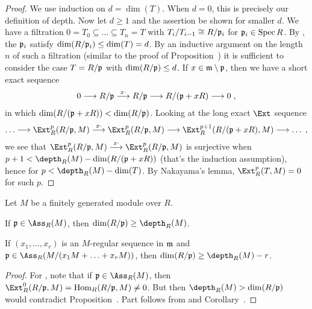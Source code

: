 \documentclass[a4paper,parskip=half,numbers=enddot, DIV=12]{scrreprt}
\begin{document}
\begin{proof}
	We use induction on $d=\dim(T)$. When $d=0$, this is precisely our definition of depth. Now let $d\geq 1$ and the assertion be shown for smaller $d$. We have a filtration $0=T_0\subseteq\ldots\subseteq T_n=T$ with $T_i/T_{i-1}\cong R/\mathfrak{p}_i$ for $\mathfrak{p}_i\in\operatorname{Spec} R$. By \cite[Fact~3.4.1]{alg2}, the $\mathfrak{p}_i$ satisfy $\dim(R/\mathfrak{p}_i)\leq \dim(T)=d$. By an inductive argument on the length $n$ of such a filtration (similar to the proof of Proposition~) it is sufficient to consider the case $T=R/\mathfrak{p}$ with $\dim(R/\mathfrak{p})\leq d$. If $x\in\mathfrak{m}\setminus \mathfrak{p}$, then we have a short exact sequence 
	\begin{align*}
		0\morphism R/\pp\morphism[x\cdot ]R/\pp\morphism R/(\pp+xR)\morphism 0\;, 
	\end{align*}
	in which $\dim(R/(\mathfrak{p}+xR))<\dim(R/\mathfrak{p})$. Looking at the long exact $\Ext$ sequence
	\begin{align*}
		\ldots\morphism\Ext_R^p(R/\pp,M)\morphism[x\cdot]\Ext_R^p(R/\pp,M)\morphism\Ext_R^{p+1}(R/(\pp+xR),M)\morphism\ldots\;,
	\end{align*}
	we see that $\Ext_R^p(R/\pp,M)\morphism[x\cdot]\Ext_R^p(R/\pp,M)$ is surjective when $p+1<\depth_R(M)-\dim(R/(\pp+xR))$ (that's the induction assumption), hence for $p<\depth_R(M)-\dim(T)$. By Nakayama's lemma, $\Ext_R^p(T,M)=0$ for such $p$.
\end{proof}
\begin{cor}
	Let $M$ be a finitely generated module over $R$.
	\begin{alphanumerate}
		\item {}If $\pp\in\Ass_R(M)$, then $\dim(R/\pp)\geq\depth_R(M)$.
		\item If $(x_1,\ldots,x_r)$ is an $M$-regular sequence in $\mathfrak{m}$ and $\pp\in\Ass_R(M/(x_1M+\ldots+x_rM))$, then $\dim(R/\pp)\geq \depth_R(M)-r$.
	\end{alphanumerate}
\end{cor}
\begin{proof}
	For , note that if $\pp\in\Ass_R(M)$, then $\Ext_R^0(R/\pp,M)=\Hom_R(R/\pp,M)\neq 0$. But then $\depth_R(M)>\dim (R/\pp)$ would contradict Proposition~. Part  follows from  and Corollary~.
\end{proof}
\end{document}
